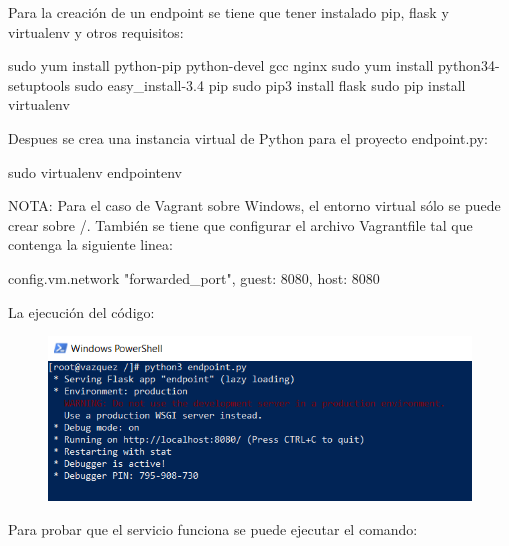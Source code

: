 \documentclass[]{article}
\newenvironment{Shaded}{\begin{snugshade}}{\end{snugshade}}
\newcommand{\StringTok}[1]{\textcolor[rgb]{0.31,0.60,0.02}{#1}}
\newcommand{\FunctionTok}[1]{\textcolor[rgb]{0.00,0.00,0.00}{#1}}
\newcommand{\ExtensionTok}[1]{#1}
\newcommand{\NormalTok}[1]{#1}
\begin{document}
Para la creación de un endpoint se tiene que tener instalado pip, flask
y virtualenv y otros requisitos:

\begin{Shaded}
\begin{Highlighting}[]
\FunctionTok{sudo}\NormalTok{ yum install python-pip python-devel gcc nginx}
\FunctionTok{sudo}\NormalTok{ yum install python34-setuptools}
\FunctionTok{sudo}\NormalTok{ easy_install-3.4 pip}
\FunctionTok{sudo}\NormalTok{ pip3 install flask}
\FunctionTok{sudo}\NormalTok{ pip install virtualenv}
\end{Highlighting}
\end{Shaded}

Despues se crea una instancia virtual de Python para el proyecto
endpoint.py:

\begin{Shaded}
\begin{Highlighting}[]
\FunctionTok{sudo}\NormalTok{ virtualenv endpointenv}
\end{Highlighting}
\end{Shaded}

NOTA: Para el caso de Vagrant sobre Windows, el entorno virtual sólo se
puede crear sobre /. También se tiene que configurar el archivo
Vagrantfile tal que contenga la siguiente linea:

\begin{Shaded}
\begin{Highlighting}[]
\ExtensionTok{config.vm.network} \StringTok{"forwarded_port"}\NormalTok{, guest: 8080, host: 8080}
\end{Highlighting}
\end{Shaded}

La ejecución del código:

\begin{figure}[htbp]
\centering
\includegraphics{endpointpyex.png}
\end{figure}

\newpage

Para probar que el servicio funciona se puede ejecutar el comando:
\end{document}
